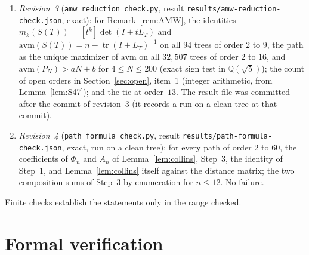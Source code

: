 \documentclass[11pt]{amsart}
\theoremstyle{definition}
\theoremstyle{remark}
\newcommand{\tr}{\operatorname{tr}}
\begin{document}
\begin{enumerate}
\nolinkurl{results/upper-bound.json}, run at commit \texttt{917d657} on a
clean worktree, 0 failures): Theorem~\ref{thm:T10} on all trees of order $2$
to $20$; the inequality of Lemma~\ref{lem:S46} exactly for $n\le200$;
Theorem~\ref{thm:upper} on all trees of order $3$ to $18$ and, through (C), on
paths for $n\le2000$; Lemma~\ref{lem:S45} on all rooted trees with
$2\le|X|\le8$, $j_1+j_2\le8$; Lemma~\ref{lem:S44}(iii) for $N\le60$;
Lemma~\ref{lem:S43} on all pairs of rooted trees of order at most $6$;
Lemma~\ref{lem:S42} in floating point (exploratory) on trees of order $3$ to
$14$. The criterion of Lemma~\ref{lem:S47} was checked against the exact peak
of the path for $n\le2000$.
\item \emph{Revision~3} (\nolinkurl{amw_reduction_check.py}, result
\nolinkurl{results/amw-reduction-check.json}, exact): for
Remark~\ref{rem:AMW}, the identities $m_k(S(T))=[t^k]\det(I+tL_T)$ and
$\mathrm{avm}(S(T))=n-\tr(I+L_T)^{-1}$ on all $94$ trees of order $2$ to $9$,
the path as the unique maximizer of $\mathrm{avm}$ on all $32{,}507$ trees of
order $2$ to $16$, and $\mathrm{avm}(P_N)>aN+b$ for $4\le N\le200$ (exact
sign test in $\mathbb Q(\sqrt5)$); the count of open orders in
Section~\ref{sec:open}, item~1 (integer arithmetic, from
Lemma~\ref{lem:S47}); and the tie at order~$13$. The result file was
committed after the commit of revision~3 (it records a run on a clean tree
at that commit).
\item \emph{Revision~4} (\nolinkurl{path_formula_check.py}, result
\nolinkurl{results/path-formula-check.json}, exact, run on a clean tree):
for every path of order $2$ to $60$, the coefficients of $\Phi_n$ and $A_n$
of Lemma~\ref{lem:collins}, Step~3, the identity of Step~1, and
Lemma~\ref{lem:collins} itself against the distance matrix; the two
composition sums of Step~3 by enumeration for $n\le12$. No failure.
\end{enumerate}
Finite checks establish the statements only in the range checked.

\section{Formal verification}\label{sec:formal}
\end{document}
